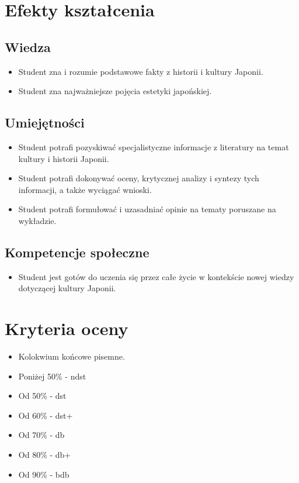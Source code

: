 \documentclass[12pt, a4paper]{article}
\begin{document}
\section{Efekty kształcenia}

\subsection*{Wiedza}
\begin{itemize}
  \item Student zna i rozumie podstawowe fakty z historii i kultury Japonii.
  \item Student zna najważniejsze pojęcia estetyki japońskiej.
\end{itemize}

\subsection*{Umiejętności}
\begin{itemize}
  \item Student potrafi pozyskiwać specjalistyczne informacje z literatury na temat kultury i historii Japonii.
  \item Student potrafi dokonywać oceny, krytycznej analizy i syntezy tych informacji, a także wyciągać wnioski.
  \item Student potrafi formułować i uzasadniać opinie na tematy poruszane na wykładzie.
\end{itemize}

\subsection*{Kompetencje społeczne}
\begin{itemize}
  \item Student jest gotów do uczenia się przez całe życie w kontekście nowej wiedzy dotyczącej kultury Japonii.
\end{itemize}

\section{Kryteria oceny}

\begin{itemize}
  \item Kolokwium końcowe pisemne.
  \item Poniżej 50\% - ndst
  \item Od 50\% - dst
  \item Od 60\% - dst+
  \item Od 70\% - db
  \item Od 80\% - db+
  \item Od 90\% - bdb
\end{itemize}
\end{document}
